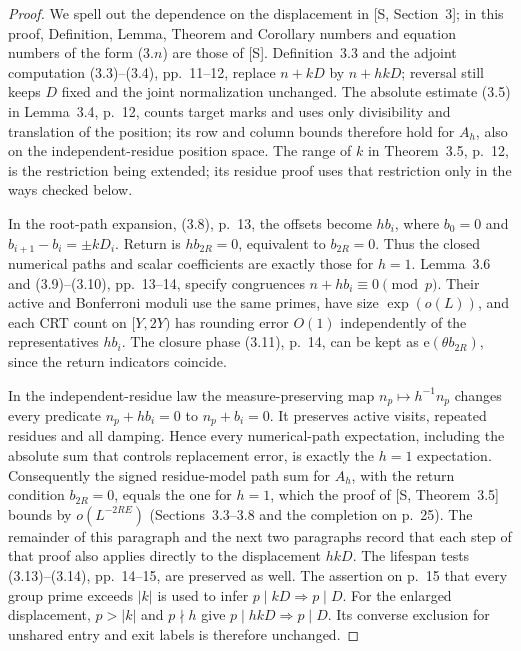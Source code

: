\documentclass[11pt]{article}
\theoremstyle{definition}
\newcommand{\e}{\mathrm e}
\theoremstyle{remark}
\begin{document}
\begin{proof}
We spell out the dependence on the displacement in [S, Section~3]; in this proof, Definition, Lemma, Theorem and Corollary numbers and equation numbers of the form (3.$n$) are those of [S].
Definition~3.3 and the adjoint computation (3.3)--(3.4), pp.~11--12,
replace $n+kD$ by $n+hkD$; reversal still keeps $D$ fixed and the
joint normalization unchanged. The absolute estimate (3.5) in
Lemma~3.4, p.~12, counts target marks and uses only divisibility and
translation of the position; its row and column bounds therefore hold
for $A_h$, also on the independent-residue position space.
The range of $k$ in Theorem~3.5, p.~12, is the restriction being extended;
its residue proof uses that restriction only in the ways checked below.

In the root-path expansion, (3.8), p.~13, the offsets become $hb_i$,
where $b_0=0$ and $b_{i+1}-b_i=\pm kD_i$. Return is
$hb_{2R}=0$, equivalent to $b_{2R}=0$. Thus the closed numerical paths
and scalar coefficients are exactly those for $h=1$.
Lemma~3.6 and (3.9)--(3.10), pp.~13--14, specify congruences
$n+hb_i\equiv0\pmod p$. Their active and Bonferroni moduli use
the same primes, have size $\exp(o(L))$, and each CRT count on
$[Y,2Y)$ has rounding error $O(1)$ independently of the representatives
$hb_i$. The closure phase (3.11), p.~14, can be kept as
$\e(\theta b_{2R})$, since the return indicators coincide.

In the independent-residue law the measure-preserving map
$n_p\mapsto h^{-1}n_p$ changes every predicate
$n_p+hb_i=0$ to $n_p+b_i=0$. It preserves active visits,
repeated residues and all damping. Hence every numerical-path
expectation, including the absolute sum that controls replacement
error, is exactly the $h=1$ expectation. Consequently the signed
residue-model path sum for $A_h$, with the return condition
$b_{2R}=0$, equals the one for $h=1$, which the proof of
[S, Theorem~3.5] bounds by $o(L^{-2RE})$ (Sections~3.3--3.8 and the
completion on p.~25). The remainder of this paragraph and the next
two paragraphs record that each step of that proof also applies
directly to the displacement $hkD$. The lifespan tests
(3.13)--(3.14), pp.~14--15, are preserved as well.
The assertion on p.~15 that every group prime exceeds $|k|$
is used to infer $p\mid kD\Rightarrow p\mid D$.
For the enlarged displacement, $p>|k|$ and $p\nmid h$ give
$p\mid hkD\Rightarrow p\mid D$. Its converse exclusion for
unshared entry and exit labels is therefore unchanged.


\end{proof}
\end{document}
